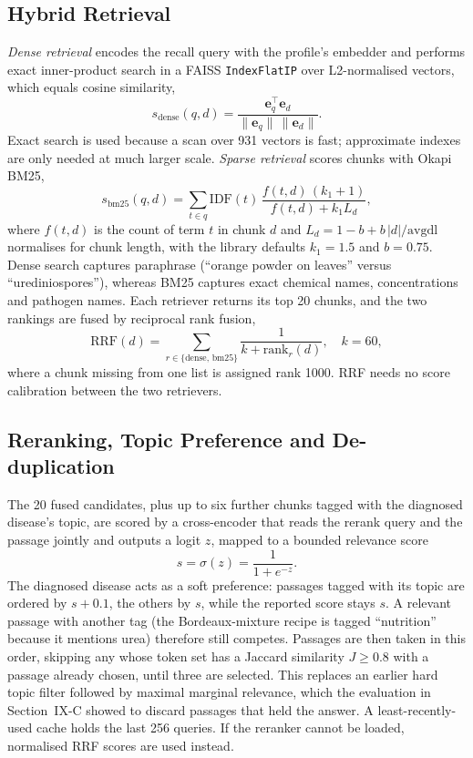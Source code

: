\subsection{Hybrid Retrieval}
\textit{Dense retrieval} encodes the recall query with the profile's embedder and performs exact inner-product search in
a FAISS \texttt{IndexFlatIP} over L2-normalised vectors, which equals cosine similarity,
\begin{equation}
s_{\mathrm{dense}}(q,d) = \frac{\mathbf{e}_q^{\top}\mathbf{e}_d}{\lVert\mathbf{e}_q\rVert\,\lVert\mathbf{e}_d\rVert}.
\end{equation}
Exact search is used because a scan over 931 vectors is fast; approximate indexes are only needed at much larger scale.
\textit{Sparse retrieval} scores chunks with Okapi BM25,
\begin{equation}
s_{\mathrm{bm25}}(q,d)=\sum_{t\in q}\mathrm{IDF}(t)\,\frac{f(t,d)\,(k_1+1)}{f(t,d)+k_1 L_d},
\end{equation}
where $f(t,d)$ is the count of term $t$ in chunk $d$ and $L_d = 1-b+b\,|d|/\mathrm{avgdl}$ normalises for chunk length,
with the library defaults $k_1=1.5$ and $b=0.75$. Dense search captures paraphrase (``orange powder on leaves'' versus
``urediniospores''), whereas BM25 captures exact chemical names, concentrations and pathogen names. Each retriever
returns its top 20 chunks, and the two rankings are fused by reciprocal rank fusion,
\begin{equation}
\mathrm{RRF}(d)=\sum_{r\in\{\mathrm{dense},\,\mathrm{bm25}\}}\frac{1}{k+\mathrm{rank}_r(d)},\quad k=60,
\end{equation}
where a chunk missing from one list is assigned rank 1000. RRF needs no score calibration between the two retrievers.

\subsection{Reranking, Topic Preference and De-duplication}
The 20 fused candidates, plus up to six further chunks tagged with the diagnosed disease's topic, are scored by a
cross-encoder that reads the rerank query and the passage jointly and outputs a logit $z$,
mapped to a bounded relevance score
\begin{equation}
s = \sigma(z) = \frac{1}{1+e^{-z}} .
\end{equation}
The diagnosed disease acts as a soft preference: passages tagged with its topic are ordered by $s+0.1$, the others by
$s$, while the reported score stays $s$. A relevant passage with another tag (the Bordeaux-mixture recipe is tagged
``nutrition'' because it mentions urea) therefore still competes. Passages are then taken in this order, skipping any
whose token set has a Jaccard similarity $J\geq0.8$ with a passage already chosen, until three are selected. This
replaces an earlier hard topic filter followed by maximal marginal relevance, which the
evaluation in Section~IX-C showed to discard passages that held the answer. A least-recently-used cache holds
the last 256 queries. If the reranker cannot be loaded, normalised RRF scores are used instead.

